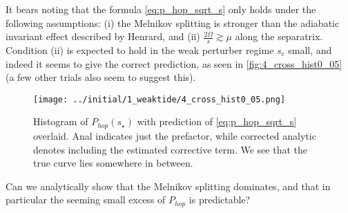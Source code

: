 \documentclass[11pt,
        usenames, %
        dvipsnames %
    ]{article}
\begin{document}
It bears noting that the formula \autoref{eq:p_hop_sqrt_s} only holds under the
following assumptions: (i) the Melnikov splitting is stronger than the adiabatic
invariant effect described by Henrard, and (ii) $\frac{2\Omega}{s} \gtrsim \mu$
along the separatrix. Condition (ii) is expected to hold in the weak perturber
regime $s_c$ small, and indeed it seems to give the correct prediction, as seen
in \autoref{fig:4_cross_hist0_05} (a few other trials also seem to suggest
this).
\begin{figure}[t]
    \centering
    \texttt{[image: ../initial/1\_weaktide/4\_cross\_hist0\_05.png]}
    \caption{Histogram of $P_{hop}(s_\star)$ with prediction of
    \autoref{eq:p_hop_sqrt_s} overlaid. Anal indicates just the prefactor, while
    corrected analytic denotes including the estimated corrective term. We see
    that the true curve lies somewhere in between.}\label{fig:4_cross_hist0_05}
\end{figure}

Can we analytically show that the Melnikov splitting dominates, and that in
particular the seeming small excess of $P_{hop}$ is predictable?
\end{document}
